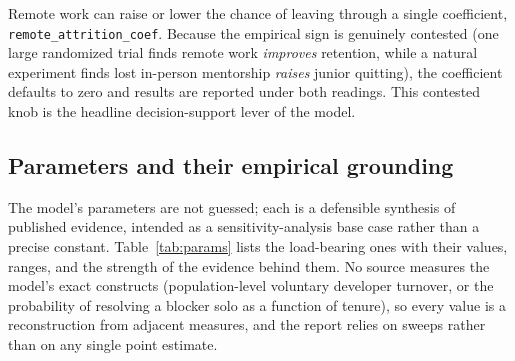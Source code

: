 \documentclass[11pt,a4paper]{article}
\begin{document}
Remote work can raise or lower the chance of leaving through a single coefficient,
\texttt{remote\_attrition\_coef}. Because the empirical sign is genuinely contested (one large
randomized trial finds remote work \emph{improves} retention, while a natural experiment finds lost
in-person mentorship \emph{raises} junior quitting), the coefficient defaults to zero and results are
reported under both readings. This contested knob is the headline decision-support lever of the model.

\subsection{Parameters and their empirical grounding}

The model's parameters are not guessed; each is a defensible synthesis of published evidence,
intended as a sensitivity-analysis base case rather than a precise constant. Table~\ref{tab:params}
lists the load-bearing ones with their values, ranges, and the strength of the evidence behind them.
No source measures the model's exact constructs (population-level voluntary developer turnover, or
the probability of resolving a blocker solo as a function of tenure), so every value is a
reconstruction from adjacent measures, and the report relies on sweeps rather than on any single
point estimate.
\end{document}
